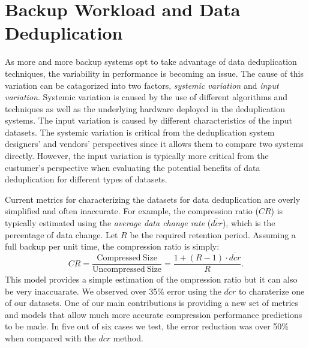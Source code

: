 \chapter{Backup Workload and Data Deduplication}
\label{BW}

As more and more backup systems opt to take advantage of data deduplication techniques, the variability in performance is becoming an issue. 
The cause of this variation can be catagorized into two factors, \emph{systemic variation} and \emph{input variation}. Systemic variation is caused by the use of different algorithms and techniques as well as the underlying hardware deployed in the deduplication systems. The input variation is caused by different characteristics of the input datasets. The systemic variation is critical from the deduplication system designers' and vendors' perspectives since it allows them to compare two systems directly. However, the input variation is typically more critical from the custumer's perspective when evaluating the potential benefits of data deduplication for different types of datasets.  

Current metrics for characterizing the datasets for data deduplication are overly simplified and often inaccurate. For example, the compression ratio ($\mathit{CR}$) is typically estimated using the \emph{average data change rate} ($\overline{\mathit{dcr}}$), which is the percentage of data change. Let $R$ be the required retention period. Assuming a full backup per unit time, the compression ratio is simply: 
\begin{equation}\label{dcr_est}
\mathit{CR}= \frac{\mathrm{Compressed\ Size}}{\mathrm{Uncompressed\ Size}}=\frac{1+(R-1)\cdot \overline{\mathit{dcr}}}{R}. 
\end{equation}
This model provides a simple estimation of the ompression ratio but it can also be very inaccuarate. We observed over 35\% error using the $\overline{\mathit{dcr}}$ to charaterize one of our datasets. One of our main contributions is providing a new set of metrics and models that allow much more accurate compression performance predictions to be made. In five out of six cases we test, the error reduction was over 50\% when compared with the $\overline{\mathit{dcr}}$ method.  

